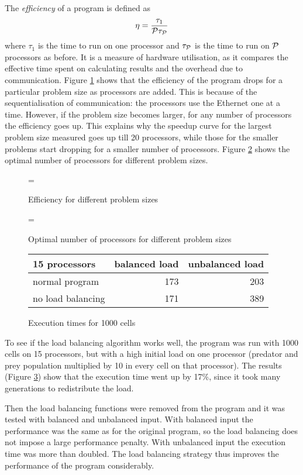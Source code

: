 The {\em efficiency} of a program is defined as
\[
        \eta = \frac{\tau_1}{{\cal P}\tau_{\cal P}}
\]
where $\tau_1$ is the time to run on one
processor and $\tau_{\cal P}$ is the time to run on ${\cal P}$ processors
as before. It is a measure of hardware utilisation, as it compares the
effective time spent on calculating results and the overhead due
to communication. Figure \ref{fEfficiency} shows that the
efficiency of the program drops for a particular problem size as
processors are added. This is because of the sequentialisation of
communication: the processors use the Ethernet one at a time. However, if the
problem size becomes larger, for any number of processors the efficiency 
goes up.
This explains why the speedup curve for the largest problem size
measured goes up till 20 processors, while those for the smaller
problems start dropping for a smaller number of processors.
Figure \ref{fOptimal} shows the optimal number of processors for
different problem sizes.

\begin{figure}[p]
\epsfxsize=\textwidth
{}
\caption{Efficiency for different problem sizes}
\label{fEfficiency}
\end{figure}

\begin{figure}[p]
\epsfxsize=\textwidth
{}
\caption{Optimal number of processors for different problem sizes}
\label{fOptimal}
\end{figure}

\begin{figure}[p]
\begin{center}
\begin{tabular}{|l|r|r|}
\hline
15 processors	& balanced load 	& unbalanced load \\
\hline
normal program	& 173			& 203 \\
\hline
no load balancing & 171			& 389 \\
\hline
\end{tabular}
\end{center}
\caption{Execution times for 1000 cells}
\label{fNoLoadBal}
\end{figure}

To see if the load balancing algorithm works well, the program was run
with 1000 cells on 15 processors, but
with a high initial load on one processor (predator and prey
population multiplied by 10 in every cell on that processor). The
results (Figure \ref{fNoLoadBal}) show that 
the execution time went up by 17\%, since it took many generations to
redistribute the load.

Then the load balancing functions were removed from the program and it
was tested with balanced and unbalanced input. With balanced input the
performance was the same as for the original program, so the load
balancing does not impose a large performance penalty. With unbalanced
input the execution time was more than doubled. The load balancing
strategy thus improves the performance of the program considerably.
